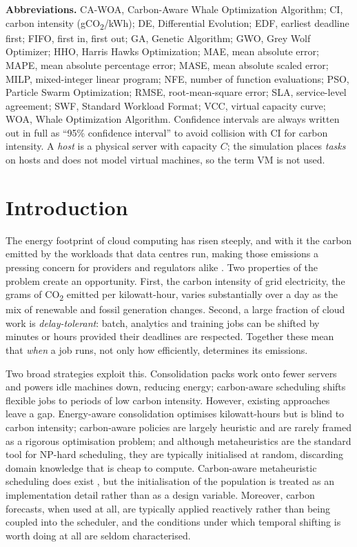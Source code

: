 \documentclass[12pt,a4paper]{article}
\begin{document}
\vspace{4pt}
\noindent\textbf{Abbreviations.}
CA-WOA, Carbon-Aware Whale Optimization Algorithm;
CI, carbon intensity (gCO\textsubscript{2}/kWh);
DE, Differential Evolution;
EDF, earliest deadline first;
FIFO, first in, first out;
GA, Genetic Algorithm;
GWO, Grey Wolf Optimizer;
HHO, Harris Hawks Optimization;
MAE, mean absolute error;
MAPE, mean absolute percentage error;
MASE, mean absolute scaled error;
MILP, mixed-integer linear program;
NFE, number of function evaluations;
PSO, Particle Swarm Optimization;
RMSE, root-mean-square error;
SLA, service-level agreement;
SWF, Standard Workload Format;
VCC, virtual capacity curve;
WOA, Whale Optimization Algorithm.
Confidence intervals are always written out in full as ``95\% confidence interval'' to avoid collision with
CI for carbon intensity. A \emph{host} is a physical server with capacity $C$; the simulation places
\emph{tasks} on hosts and does not model virtual machines, so the term VM is not used.

\section{Introduction}\label{sec:intro}
The energy footprint of cloud computing has risen steeply, and with it the carbon emitted by the workloads that
data centres run, making those emissions a pressing concern for providers and regulators alike
\cite{radovanovic2023carbon, dodge2022measuring}. Two properties of the problem create an opportunity. First, the carbon intensity of grid
electricity, the grams of CO\textsubscript{2} emitted per kilowatt-hour, varies substantially over a day
as the mix of renewable and fossil generation changes. Second, a large fraction of cloud work is
\emph{delay-tolerant}: batch, analytics and training jobs can be shifted by minutes or hours provided their
deadlines are respected. Together these mean that \emph{when} a job runs, not only how efficiently, determines
its emissions.

Two broad strategies exploit this. Consolidation packs work onto fewer servers and powers idle machines down,
reducing energy; carbon-aware scheduling shifts flexible jobs to periods of low carbon intensity. However,
existing approaches leave a gap. Energy-aware consolidation optimises kilowatt-hours but is blind to carbon
intensity; carbon-aware policies are largely heuristic and are rarely framed as a rigorous optimisation
problem; and although metaheuristics are the standard tool for NP-hard scheduling, they are typically initialised at
random, discarding domain knowledge that is cheap to compute. Carbon-aware metaheuristic scheduling does exist
\cite{abbasikhazaei2022energy, khodayarseresht2023energy, miao2024energy, danach2026carbon, ruparel2026carbon},
but the initialisation of the population is treated as an implementation detail rather than as a design
variable. Moreover, carbon forecasts, when used at all, are typically applied reactively rather than being
coupled into the scheduler, and the conditions under which temporal shifting is worth doing at all are seldom
characterised.
\end{document}
